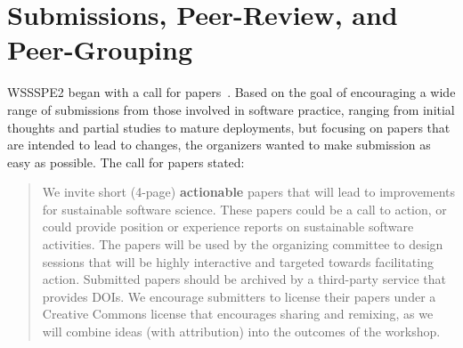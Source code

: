 \documentclass[11pt, oneside]{amsart}
\newcommand{\note}[1]{ {\textcolor{blueish}    { ***Note:      #1 }}}
\begin{document}
\section{Submissions, Peer-Review, and Peer-Grouping} \label{sec:preworkshop}


WSSSPE2 began with a call for papers~\cite{WSSSPE2-pre-report}. Based on the
goal of encouraging a wide range of submissions from those involved in software
practice, ranging from initial thoughts and partial studies to mature
deployments, but focusing on papers that are intended to lead to changes, the
organizers wanted to make submission as easy as possible. The call for papers
stated:

\begin{quote} We invite short (4-page) \textbf{actionable} papers that will lead
to improvements for sustainable software science. These papers could be a call
to action, or could provide position or experience reports on sustainable
software activities. The papers will be used by the organizing committee to
design sessions that will be highly interactive and targeted towards
facilitating action. Submitted papers should be archived by a third-party
service that provides DOIs. We encourage submitters to license their papers
under a Creative Commons license that encourages sharing and remixing, as we
will combine ideas (with attribution) into the outcomes of the workshop.
\end{quote}
\end{document}
